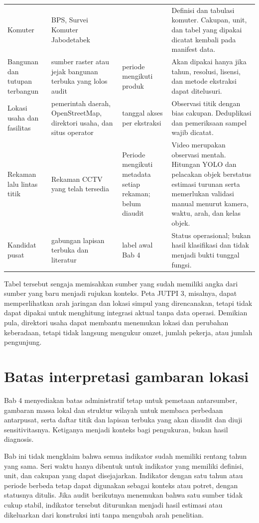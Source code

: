 \documentclass[11pt,a4paper,oneside,openany,indonesian]{report}
\begin{document}
\begin{longtable}{>{\raggedright\arraybackslash}p{} >{\raggedright\arraybackslash}p{} >{\raggedright\arraybackslash}p{} >{\raggedright\arraybackslash}p{}}
Komuter & BPS, Survei Komuter Jabodetabek & 2023 & Definisi dan tabulasi komuter. Cakupan, unit, dan tabel yang dipakai dicatat kembali pada manifest data. \\
Bangunan dan tutupan terbangun & sumber raster atau jejak bangunan terbuka yang lolos audit & periode mengikuti produk & Akan dipakai hanya jika tahun, resolusi, lisensi, dan metode ekstraksi dapat ditelusuri. \\
Lokasi usaha dan fasilitas & pemerintah daerah, OpenStreetMap, direktori usaha, dan situs operator & tanggal akses per ekstraksi & Observasi titik dengan bias cakupan. Deduplikasi dan pemeriksaan sampel wajib dicatat. \\
Rekaman lalu lintas titik & Rekaman CCTV yang telah tersedia & Periode mengikuti metadata setiap rekaman; belum diaudit & Video merupakan observasi mentah. Hitungan YOLO dan pelacakan objek berstatus estimasi turunan serta memerlukan validasi manual menurut kamera, waktu, arah, dan kelas objek. \\
Kandidat pusat & gabungan lapisan terbuka dan literatur & label awal Bab 4 & Status operasional; bukan hasil klasifikasi dan tidak menjadi bukti tunggal fungsi. \\
\end{longtable}
\endgroup

Tabel tersebut sengaja memisahkan sumber yang sudah memiliki angka dari sumber yang baru menjadi rujukan konteks. Peta JUTPI 3, misalnya, dapat memperlihatkan arah jaringan dan lokasi simpul yang direncanakan, tetapi tidak dapat dipakai untuk menghitung integrasi aktual tanpa data operasi. Demikian pula, direktori usaha dapat membantu menemukan lokasi dan perubahan keberadaan, tetapi tidak langsung mengukur omzet, jumlah pekerja, atau jumlah pengunjung.

\section{Batas interpretasi gambaran lokasi}

Bab 4 menyediakan batas administratif tetap untuk pemetaan antarsumber, gambaran massa lokal dan struktur wilayah untuk membaca perbedaan antarpusat, serta daftar titik dan lapisan terbuka yang akan diaudit dan diuji sensitivitasnya. Ketiganya menjadi konteks bagi pengukuran, bukan hasil diagnosis.

Bab ini tidak mengklaim bahwa semua indikator sudah memiliki rentang tahun yang sama. Seri waktu hanya dibentuk untuk indikator yang memiliki definisi, unit, dan cakupan yang dapat disejajarkan. Indikator dengan satu tahun atau periode berbeda tetap dapat digunakan sebagai konteks atau potret, dengan statusnya ditulis. Jika audit berikutnya menemukan bahwa satu sumber tidak cukup stabil, indikator tersebut diturunkan menjadi hasil estimasi atau dikeluarkan dari konstruksi inti tanpa mengubah arah penelitian.
\end{document}
